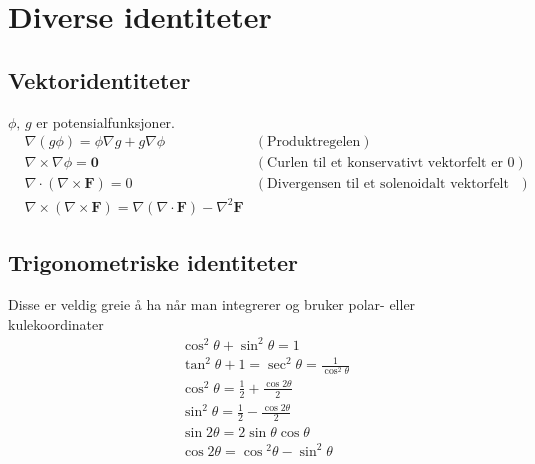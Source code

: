 \documentclass[fleqn,12pt]{wlscirep}
\begin{document}
\section{Diverse identiteter}
\subsection{Vektoridentiteter}
$\phi, \, g$ er potensialfunksjoner.
\begin{align}
    &\nabla(g\phi) = \phi \nabla g + g\nabla\phi \, &(\text{Produktregelen})\\
    &\nabla \times \nabla\phi = \textbf{0} \, &(\text{Curlen til et konservativt vektorfelt er 0})\\
    &\nabla \cdot(\nabla\times\textbf{F}) = 0 \, &(\text{Divergensen til et solenoidalt vektorfelt er 0 })\\
    &\nabla \times (\nabla \times \textbf{F}) = \nabla(\nabla \cdot \textbf{F})-\nabla^2\textbf{F}&
\end{align}
\subsection{Trigonometriske identiteter}
Disse er veldig greie å ha når man integrerer og bruker polar- eller kulekoordinater
\begin{align}
    & \cos^2{\theta} +\sin^2{\theta}  = 1\\
    &\tan^2{\theta} + 1 = \sec^2{\theta} = \frac{1}{\cos^2{\theta}}\\
    &\cos^2{\theta} = \frac{1}{2} + \frac{\cos{2\theta}}{2}\\
    &\sin^2{\theta} = \frac{1}{2} - \frac{\cos{2\theta}}{2}\\
    &\sin{2\theta} = 2\sin{\theta}\cos{\theta}\\
    &\cos{2\theta} = \cos{^2\theta}-\sin^2{\theta}
\end{align}
\end{document}
